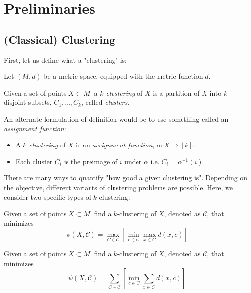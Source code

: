 \chapter{Preliminaries}

\section{(Classical) Clustering}

First, let us define what a "clustering" is:
\begin{definition}
Let $(M, d)$ be a metric space, equipped with the metric function $d$.

\noindent Given a set of points $X \subset M$, a {\it $k$-clustering} of $X$ is a partition of $X$ into $k$ disjoint subsets, $C_1, \dots, C_k$, called {\it clusters}.
\end{definition}

An alternate formulation of definition would be to use something called an {\it assignment function}:

\begin{definition}
\begin{itemize}

\item A {\it $k$-clustering} of $X$ is an {\it assignment function}, $\alpha: X \rightarrow [k]$.

\item Each cluster $C_i$ is the preimage of $i$ under $\alpha$ i.e. $C_i = \alpha^{-1}(i)$

\end{itemize}
\end{definition}


There are many ways to quantify "how good a given clustering is". Depending on the objective, different variants of clustering problems are possible.
Here, we consider two specific types of $k$-clustering:

\begin{problem}
Given a set of points $X \subset M$, find a $k$-clustering of $X$, denoted as $\mathcal{C}$, that minimizes
$$\phi(X, \mathcal{C}) = \max_{C \in \mathcal{C}} \left[ \min_{c \in C} \max_{x \in C} d(x, c) \right]$$
\end{problem}

\begin{problem}
Given a set of points $X \subset M$, find a $k$-clustering of $X$, denoted as $\mathcal{C}$, that minimizes
$$\psi(X, \mathcal{C}) = \sum_{C \in \mathcal{C}} \left[ \min_{c \in C} \sum_{x \in C} d(x, c) \right]$$
\end{problem}


